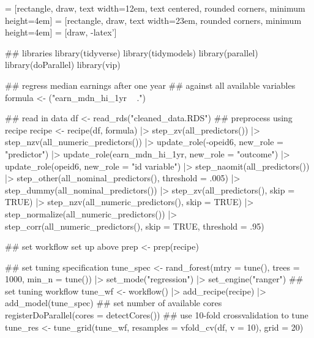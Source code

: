 \documentclass{article}
\begin{document}
\pagestyle{empty}


 = [rectangle, draw, text width=12em, text centered,
rounded corners, minimum height=4em]
 = [rectangle, draw, text width=23em,
rounded corners, minimum height=4em]
 = [draw, -latex']

\begin{myverbbox}[\footnotesize]{\setup}
  ## libraries
  library(tidyverse)
  library(tidymodels)
  library(parallel)
  library(doParallel)
  library(vip)
\end{myverbbox}

\begin{myverbbox}[\footnotesize]{\regcode}
  ## regress median earnings after one year
  ## against all available variables
  formula <- ("earn_mdn_hi_1yr ~ .")
\end{myverbbox}

\begin{myverbbox}[\footnotesize]{\precode}
  ## read in data 
  df <- read_rds("cleaned_data.RDS")
  ## preprocess using recipe
  recipe <- recipe(df, formula) |>
     step_zv(all_predictors()) |>
     step_nzv(all_numeric_predictors()) |>
     update_role(-opeid6,
                 new_role = "predictor") |>
     update_role(earn_mdn_hi_1yr,
                 new_role = "outcome") |>
     update_role(opeid6,
                 new_role = "id variable") |>
     step_naomit(all_predictors()) |>
     step_other(all_nominal_predictors(),
                threshold = .005) |>
     step_dummy(all_nominal_predictors()) |>
     step_zv(all_predictors(),
             skip = TRUE) |>
     step_nzv(all_numeric_predictors(),
              skip = TRUE) |>
     step_normalize(all_numeric_predictors()) |>
     step_corr(all_numeric_predictors(),
               skip = TRUE,
               threshold = .95)
\end{myverbbox}

\begin{myverbbox}[\footnotesize]{\workcode}
  ## set workflow set up above
  prep <- prep(recipe)
\end{myverbbox}

\begin{myverbbox}[\footnotesize]{\tunecode}
  ## set tuning specification
  tune_spec <- rand_forest(mtry = tune(),
                           trees = 1000,
                           min_n = tune()) |>
  set_mode("regression") |>
  set_engine("ranger")
  ## set tuning workflow
  tune_wf <- workflow() |>
     add_recipe(recipe) |>
     add_model(tune_spec)
  ## set number of available cores
  registerDoParallel(cores = detectCores())
  ## use 10-fold crossvalidation to tune
  tune_res <- tune_grid(tune_wf,
                        resamples = vfold_cv(df,
                                             v = 10),
                        grid = 20)
\end{myverbbox}
\end{document}
